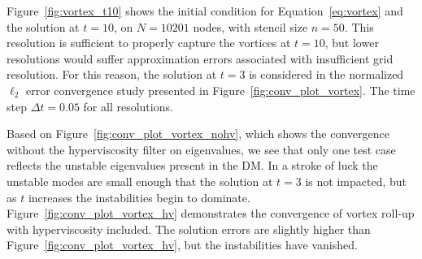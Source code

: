 \documentclass{report}
\begin{document}
Figure~\ref{fig:vortex_t10} shows the initial condition for Equation~\ref{eq:vortex} and the solution at $t = 10$, on $N=10201$ nodes, with stencil size $n=50$. This resolution is sufficient to properly capture the vortices at $t=10$, but lower resolutions would suffer approximation errors associated with insufficient grid resolution. 
For this reason, the solution at $t=3$ is considered in the normalized $\ell_2$ error convergence study presented in Figure~\ref{fig:conv_plot_vortex}. The time step $\Delta t = 0.05$ for all resolutions. 

Based on Figure~\ref{fig:conv_plot_vortex_nohv}, which shows the convergence without the hyperviscosity filter on eigenvalues, we see that only one test case reflects the unstable eigenvalues present in the DM. In a stroke of luck the unstable modes are small enough that the solution at $t=3$ is not impacted, but as $t$ increases the instabilities begin to dominate. Figure~\ref{fig:conv_plot_vortex_hv} demonstrates the convergence of vortex roll-up with hyperviscosity included. The solution errors are slightly higher than Figure~\ref{fig:conv_plot_vortex_hv}, but the instabilities have vanished. 
\end{document}
